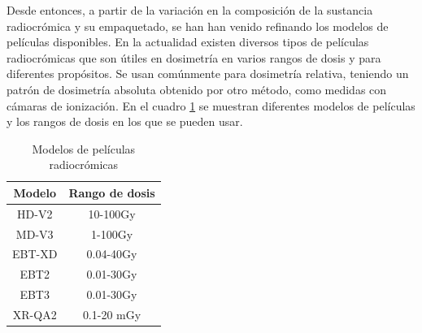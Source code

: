 Desde entonces, a partir de la variación en la composición de la sustancia radiocrómica y su empaquetado, se han han venido refinando los modelos de películas disponibles. En la actualidad existen diversos tipos de películas radiocrómicas que son útiles en dosimetría en varios rangos de dosis y para diferentes propósitos. Se usan comúnmente para dosimetría relativa, teniendo un patrón de dosimetría absoluta obtenido por otro método, como medidas con cámaras de ionización. En el cuadro \ref{tab:Modelos} se muestran diferentes modelos de películas y los rangos de dosis en los que se pueden usar.\\
\begin{table}[h!]
	\centering
	\begin{tabular}{|c|c|}
		
		\hline 
		Modelo & Rango de dosis \\ 
		\hline 
		HD-V2 & 10-100Gy \\ 
		\hline 
		MD-V3 & 1-100Gy \\ 
		\hline 
		EBT-XD & 0.04-40Gy \\ 
		\hline 
		EBT2 & 0.01-30Gy \\ 
		\hline 
		EBT3 & 0.01-30Gy \\ 
		\hline 
		XR-QA2 & 0.1-20 mGy \\ 
		\hline 
	\end{tabular} 
\caption{Modelos de películas radiocrómicas}
\label{tab:Modelos}
\end{table}

